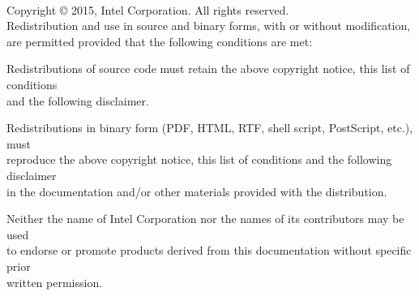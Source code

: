 \newpage

\vspace*{3.0cm}
 \\ 

\vspace*{0.5cm}

\noindent Copyright {\small\copyright} 2015, Intel Corporation. All rights reserved. \\

\noindent Redistribution and use in source and binary forms, with or without
modification, are permitted provided that the following conditions are met:

\begin{itemize*}
\item Redistributions of source code must retain the above copyright notice,
      this list of conditions \\ and the 
      following disclaimer.
\item Redistributions in binary form (PDF, HTML, RTF, shell script, PostScript,
      etc.), must \\ reproduce the above copyright notice, this list of conditions
      and the following disclaimer \\ in the documentation and/or other materials
      provided with the distribution.
\item Neither the name of Intel Corporation nor the names of its contributors
      may be used \\ to endorse or promote products derived from this
      documentation
      without specific prior \\ written permission.
\end{itemize*} 

\vspace*{0.5cm}

